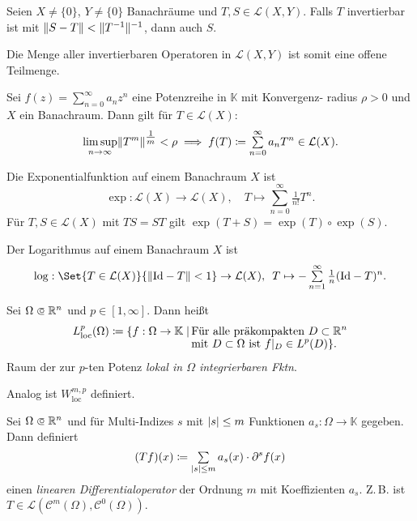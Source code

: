\documentclass{cheat-sheet}
\newcommand{\K}{\mathbb{K}}
\newcommand{\LSO}{\mathcal{L}} %
\begin{document}
\begin{satz}
  Seien $X \not= \{0\}$, $Y \not= \{0\}$ Banachräume und $T, S \in \mathcal{L}(X, Y)$. Falls $T$ invertierbar ist mit $\lVert S-T\rVert < \lVert T^{-1}\rVert^{-1}$, dann auch $S$.
\end{satz}

\begin{bem}
  Die Menge aller invertierbaren Operatoren in $\mathcal{L}(X, Y)$ ist somit eine offene Teilmenge.
\end{bem}

\begin{satz}
  Sei $f(z) = \sum_{n=0}^\infty a_n z^n$ eine Potenzreihe in $\K$ mit Konvergenz- radius $\rho > 0$ und $X$ ein Banachraum. Dann gilt für $T \in \LSO(X)$:
  \[ \limsup_{n \to \infty} \norm{T^m}^{\tfrac{1}{m}} < \rho \implies f(T) \coloneqq \sum_{n=0}^\infty a_n T^n \in \LSO(X). \]
\end{satz}

\begin{bsp}
  Die Exponentialfunktion auf einem Banachraum $X$ ist
  \[ \exp : \LSO(X) \to \LSO(X), \quad T \mapsto \sum_{n=0}^\infty \tfrac{1}{n!} T^n. \]
  Für $T, S \in \LSO(X)$ mit $TS = ST$ gilt $\exp(T+S) = \exp(T) \circ \exp(S)$.
\end{bsp}


\begin{bsp}
  Der Logarithmus auf einem Banachraum $X$ ist
  \[
    \log : \Set{ T \in \LSO(X) }{ \norm{\Id - T} < 1 } \to \LSO(X), \enspace T \mapsto - \sum_{n=1}^{\infty} \tfrac{1}{n} (\Id - T)^n.
  \]
\end{bsp}

\begin{defn}
  Sei $\Omega \opn \R^n$ und $p \in \left[ 1, \infty \right]$. Dann heißt
  \begin{align*}
    L_{\mathrm{loc}}^p(\Omega) \coloneqq \{ f : \Omega \to \K \mid \, &\text{Für alle präkompakten $D \subset \R^n$}\\[-4pt]
    &\text{mit $D \subset \Omega$ ist $f|_D \in L^p(D)$} \}.
  \end{align*}
  Raum der zur $p$-ten Potenz \emph{lokal in $\Omega$ integrierbaren Fktn}.
\end{defn}

\begin{bem}
  Analog ist $W_{\mathrm{loc}}^{m,p}$ definiert.
\end{bem}

\begin{defn}
  Sei $\Omega \opn \R^n$ und für Multi-Indizes $s$ mit $\lvert s\rvert \leq m$ Funktionen $a_s : \Omega \to \K$ gegeben. Dann definiert
  \[ (Tf)(x) \coloneqq \sum_{\abs{s} \leq m} a_s(x) \cdot \partial^s f(x) \]
  einen \emph{linearen Differentialoperator} der Ordnung $m$ mit Koeffizienten $a_s$. Z.\,B. ist $T \in \LSO(\mathcal{C}^m(\Omega), \mathcal{C}^0(\Omega))$.
\end{defn}
\end{document}
